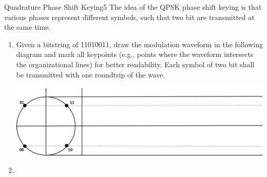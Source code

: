 \documentclass[twoside]{article}
\begin{document}
\begin{task}{Quadrature Phase Shift Keying}{5}{}
  The idea of the QPSK phase shift keying is that various phases represent different symbols, such that two bit are transmitted at the same time.

  \begin{enumerate}
  \item{Given a bitstring of 11010011, draw the modulation waveform in the following diagram and mark all keypoints (e.g., points where the waveform intersects the organizational lines) for better readability. Each symbol of two bit shall be transmitted with one roundtrip of the wave.

    \includegraphics[width=\textwidth]{gfx/qpsk.png}

  }
  \item{
    
  }
    \end{enumerate}
\end{task}
\end{document}

